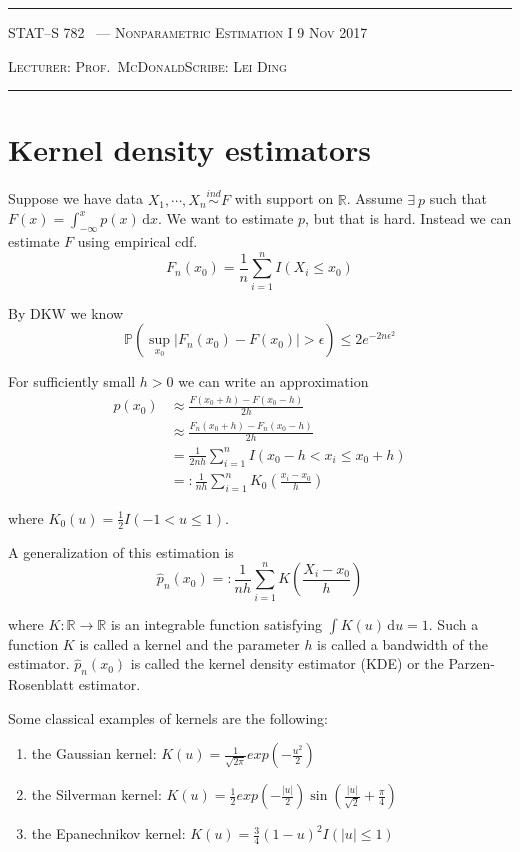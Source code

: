 \documentclass[10pt]{article}
\newcounter{lecnum}
\renewcommand{\P}{\mathbb{P}}
\newcommand{\R}{\mathbb{R}}
\renewcommand{\hat}{\widehat}
\newcommand{\lecturer}{Prof.\ McDonald}
\newcommand{\scribe}{Lei Ding}
\newcommand{\chtitle}{Nonparametric Estimation I}
\newcommand{\lecdate}{9 Nov 2017}
\begin{document}
\rule{6.5in}{1pt}

\textsc{STAT--S 782
        \hfill \thelecnum\ --- \chtitle
        \hfill \lecdate}

\textsc{Lecturer: \lecturer \hfill Scribe: \scribe}
\rule{6.5in}{1pt}

\section{Kernel density estimators}
Suppose we have data $X_1, \cdots, X_n \stackrel{ind}{\sim} F$ with support on $\R$. 
Assume $\exists \ p$ such that $F(x) = \int_{- \infty}^{x} p(x) \, \mathrm{d}x$.
We want to estimate $p$, but that is hard. Instead we can estimate $F$ using empirical cdf.
\begin{equation}
  F_n(x_0) = \frac{1}{n} \sum_{i=1}^{n} I (X_i \le x_0)
  \label{eq:1}
\end{equation}

By DKW we know
\begin{equation}
  \P (\sup_{x_0} |F_n(x_0) - F(x_0)| > \epsilon) \le 2 e^{-2n \epsilon^2}
  \label{eq:2}
\end{equation}

For sufficiently small $h > 0$ we can write an approximation
\begin{align}
  p(x_0) & \approx \frac{F(x_0 + h) - F(x_0 - h)}{2h} \\
  & \approx \frac{F_n (x_0 + h) - F_n (x_0 - h)}{2h} \\
  & = \frac{1}{2nh} \sum_{i=1}^{n} I (x_0-h < x_i \le x_0 + h)\\
  & =: \frac{1}{nh} \sum_{i=1}^{n} K_0 (\frac{x_i - x_0}{h})
  \label{eq:3}
\end{align}

where $K_0 (u) = \frac{1}{2} I (-1 < u\le 1)$.

A generalization of this estimation is 
\begin{equation}
\hat{p}_n (x_0) =: \frac{1}{nh} \sum_{i=1}^{n} K(\frac{X_i - x_0}{h})
\end{equation}

where $K: \R \to \R$ is an integrable function satisfying $\int K(u) \, \mathrm{d}u =1$.
Such a function $K$ is called a kernel and the parameter $h$ is called a bandwidth of the
estimator.
$\hat{p}_n (x_0)$ is called the kernel density estimator (KDE) or the Parzen-Rosenblatt estimator.


Some classical examples of kernels are the following:
\begin{enumerate}
\item the Gaussian kernel: $K(u) = \frac{1}{\sqrt{2 \pi}} exp (- \frac{u^2}{2})$
\item the Silverman kernel: $K(u) = \frac{1}{2} exp (- \frac{|u|}{2}) \sin (\frac{|u|}{\sqrt{2}} + \frac{\pi}{4})$
\item the Epanechnikov kernel: $K(u) = \frac{3}{4} (1-u)^2 I (|u| \le 1)$
\end{enumerate}
\end{document}
